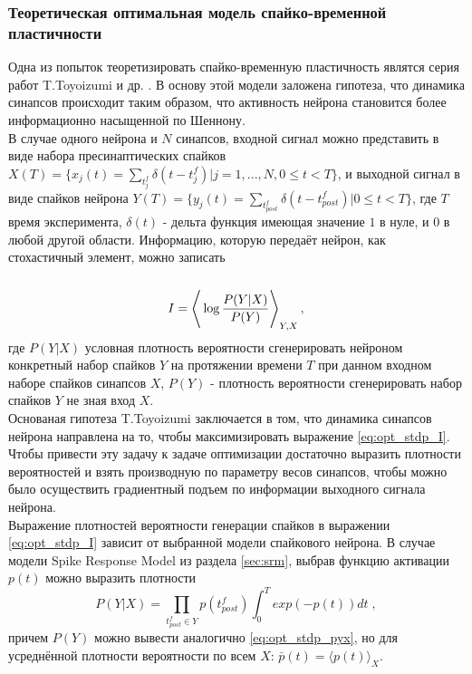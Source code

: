 \documentclass[a4paper,10pt]{article}
\def\la{\left\langle\rule{0pt}{3em}}
\def\ra{\right\rangle}
\begin{document}
\subsubsection{Теоретическая оптимальная модель спайко-временной пластичности}
\indent Одна из попыток теоретизировать спайко-временную пластичность являтся серия работ T.Toyoizumi и др. \cite{OptStdpFirst, OptStdpSecond}. В основу этой модели заложена гипотеза, что динамика синапсов происходит таким образом, что активность нейрона становится более информационно насыщенной по Шеннону.\\
\indent В случае одного нейрона и $N$ синапсов, входной сигнал можно представить в виде набора пресинаптических спайков $X(T)=\{ x_{j}(t)=\sum_{t_{j}^f}\delta(t-t_{j}^f) |j=1,...,N, 0 \leq t<T \}$, и выходной сигнал в виде спайков нейрона $Y(T)=\{ y_{j}(t)=\sum_{t_{post}^f}\delta(t-t_{post}^f) | 0 \leq t<T \}$, где $T$ время эксперимента, $\delta(t)$ - дельта функция имеющая значение $1$ в нуле, и $0$ в любой другой области. Информацию, которую передаёт нейрон, как стохастичный элемент, можно записать 
\begin{equation}\label{eq:opt_stdp_I}
I = \la\log \frac{P(Y|X)}{P(Y)} \ra_{Y,X},
\end{equation}
где $P(Y|X)$ условная плотность вероятности сгенерировать нейроном конкретный набор спайков $Y$ на протяжении времени $T$ при данном входном наборе спайков синапсов $X$, $P(Y)$ - плотность вероятности сгенерировать набор спайков $Y$ не зная вход $X$.\\
\indent Основаная гипотеза T.Toyoizumi заключается в том, что динамика синапсов нейрона направлена на то, чтобы максимизировать выражение \eqref{eq:opt_stdp_I}. Чтобы привести эту задачу к задаче оптимизации достаточно выразить плотности вероятностей и взять производную по параметру весов синапсов, чтобы можно было осуществить градиентный подъем по информации выходного сигнала нейрона.\\
\indent Выражение плотностей вероятности генерации спайков в выражении \eqref{eq:opt_stdp_I} зависит от выбранной модели спайкового нейрона. В случае модели Spike Response Model из раздела \ref{sec:srm}, выбрав функцию активации $p(t)$ можно выразить плотности
\begin{equation}\label{eq:opt_stdp_pyx}
P(Y|X)= \prod_{t_{post}^{f} \in Y } p(t_{post}^{f}) \int_{0}^{T} exp(-p(t))dt\;,
\end{equation}
причем $P(Y)$ можно вывести аналогично \eqref{eq:opt_stdp_pyx}, но для усреднённой плотности вероятности по всем $X$: $\bar{p}(t) = \langle p(t) \rangle _{X}$.\\
\end{document}
